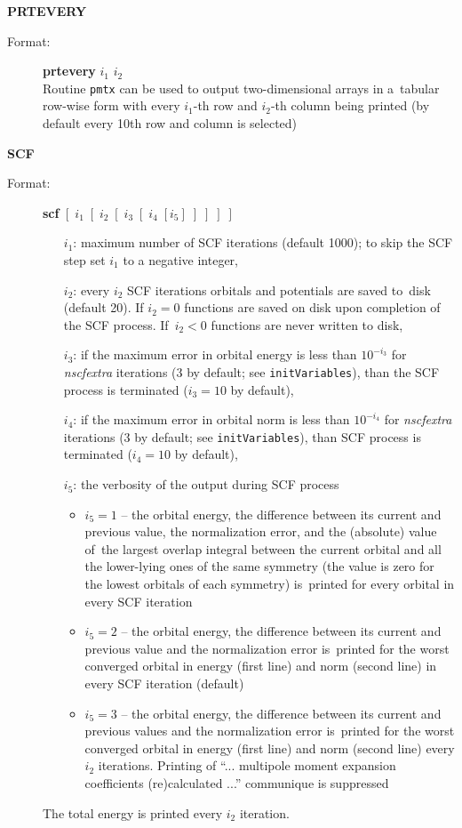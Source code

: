 \documentclass[10pt,a4paper]{article}
\newcommand{\ft}[1]{\texttt{#1}}
\begin{document}
\begin{description}
\item \textbf{PRTEVERY}
\begin{description}
\item[Format:] \textbf{prtevery} $i_1$ $i_2$ \\ Routine \ft{pmtx} can be used to output
  two-dimensional arrays in a~tabular row-wise form with every $i_1$-th row and $i_2$-th
  column being printed (by default every 10th row and column is selected)
\end{description}


\item \textbf{SCF}
\begin{description}
\item[Format:] \textbf{scf}
$[\;i_1\;[\;i_2\;[\;i_3\;[\;i_4\;[i_5]\;]\;]\;]\;]$
\begin{itemize}
\item[$i_1$:] maximum number of SCF iterations (default 1000); to skip the
  SCF step set $i_1$ to a negative integer,
\item[$i_2$:] every $i_2$ SCF iterations orbitals and potentials are saved
  to~disk (default 20).  If $i_2=0$ functions are saved on disk upon
  completion of the SCF process. If~$i_2<0$ functions are never written to
  disk,
\item[$i_3$:] if the maximum error in orbital energy is less than
  $10^{-i_3}$ for \textsl{nscfextra} iterations (3 by default; see
  \ft{initVariables}), than the SCF process is terminated ($i_3=10$ by default),
\item[$i_4$:] if the maximum error in orbital norm is less than $10^{-i_4}$
  for \textsl{nscfextra} iterations (3 by default; see \ft{initVariables}), than
  SCF process is terminated ($i_4=10$ by default),
\item[$i_5$:] the verbosity of the output during SCF process
\begin{itemize}
\item $i_5=1$ -- the orbital energy, the difference between its current and previous
  value, the normalization error, and the (absolute) value of~the largest overlap integral
  between the current orbital and all the lower-lying ones of the same symmetry (the value
  is zero for the lowest orbitals of each symmetry) is~printed for every orbital in every
  SCF iteration
\item $i_5=2$ -- the orbital energy, the difference between its current and previous value
  and the normalization error is~printed for the worst converged orbital in energy (first
  line) and norm (second line) in every SCF iteration (default)
\item $i_5=3$ -- the orbital energy, the difference between its current and previous values
  and the normalization error is~printed for the worst converged orbital in energy (first
  line) and norm (second line) every $i_2$ iterations. Printing of ``... multipole moment
  expansion coefficients (re)calculated ...''  communique is suppressed
\end{itemize}
\end{itemize}
The total energy is printed every $i_2$ iteration.
\end{description}


\end{description}
\end{document}
